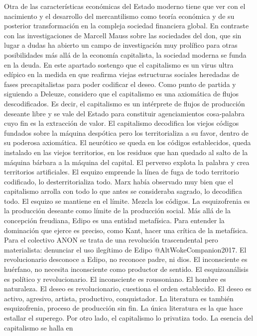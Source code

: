 \documentclass[
]{article}
\begin{document}
Otra de las características económicas del Estado moderno tiene que ver
con el nacimiento y el desarrollo del mercantilismo como teoría
económica y de su posterior transformación en la compleja sociedad
financiera global. En contraste con las investigaciones de Marcell Mauss
sobre las sociedades del don, que sin lugar a dudas ha abierto un campo
de investigación muy prolífico para otras posibilidades más allá de la
economía capitalista, la sociedad moderna se funda en la deuda. En este
apartado sostengo que el capitalismo es un virus ultra edípico en la
medida en que reafirma viejas estructuras sociales heredadas de fases
precapitalistas para poder codificar el deseo. Como punto de partida y
siguiendo a Deleuze, considero que el capitalismo es una axiomática de
flujos descodificados. Es decir, el capitalismo es un intérprete de
flujos de producción deseante libre y se vale del Estado para constituir
agenciamientos cosa-palabra cuyo fin es la extracción de valor. El
capitalismo decodifica los viejos códigos fundados sobre la máquina
despótica pero los territorializa a su favor, dentro de su poderosa
axiomática. El neurótico se queda en los códigos establecidos, queda
instalado en las viejos territorios, en los residuos que han quedado al
salto de la máquina bárbara a la máquina del capital. El perverso
explota la palabra y crea territorios artificiales. El esquizo emprende
la línea de fuga de todo territorio codificado, lo desterritorializa
todo. Marx había observado muy bien que el capitalismo arrolla con todo
lo que antes se consideraba sagrado, lo decodifica todo. El esquizo se
mantiene en el límite. Mezcla los códigos. La esquizofrenia es la
producción deseante como límite de la producción social. Más allá de la
concepción freudiana, Edipo es una entidad metafísica. Para entender la
dominación que ejerce es preciso, como Kant, hacer una crítica de la
metafísica. Para el colectivo ANON se trata de una revolución
trascendental pero materialista: denunciar el uso ilegítimo de Edipo
@AltWokeCompanion2017. El revolucionario desconoce a Edipo, no reconoce
padre, ni dios. El inconsciente es huérfano, no necesita inconsciente
como productor de sentido. El esquizoanálisis es político y
revolucionario. El inconsciente es roussoniano. El hombre es naturaleza.
El deseo es revolucionario, cuestiona el orden establecido. El deseo es
activo, agresivo, artista, productivo, conquistador. La literatura es
también esquizofrenia, proceso de producción sin fin. La única
literatura es la que hace estallar el superego. Por otro lado, el
capitalismo lo privatiza todo. La esencia del capitalismo se halla en
\end{document}
